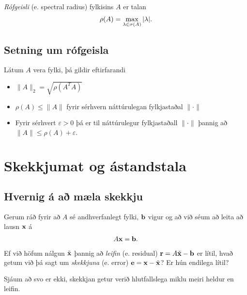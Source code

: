 \documentclass[letterpaper,10pt,icelandic]{sphinxmanual}
\begin{document}
\emph{Rófgeisli} (e. spectral radius) fylkisins \(A\) er talan
\begin{gather}
\begin{split}\rho(A) = \max_{\lambda \in \sigma(A)} |\lambda|.\end{split}\notag
\end{gather}

\subsection{Setning um rófgeisla}
\label{kafli08:setning-um-rofgeisla}\label{kafli08:rofgeisli}
Látum \(A\) vera fylki, þá gildir eftirfarandi
\begin{itemize}
\item {} 
\(\|A\|_2 = \sqrt{\rho(A^T A)}\)

\item {} 
\(\rho(A) \leq \|A\|\) fyrir sérhvern náttúrulegan fylkjastaðal
\(\|\cdot\|\)

\item {} 
Fyrir sérhvert \(\varepsilon>0\) þá er til náttúrulegur
fylkjastaðall \(\|\cdot\|\) þannig að
\(\|A\| \leq \rho(A) + \varepsilon\).

\end{itemize}


\section{Skekkjumat og ástandstala}
\label{kafli08:skekkjumat-og-astandstala}\label{kafli08:index-13}

\subsection{Hvernig á að mæla skekkju}
\label{kafli08:hvernig-a-a-maela-skekkju}
Gerum ráð fyrir að \(A\) sé andhverfanlegt fylki,
\(\mbox{${\bf b}$}\) vigur og að við séum að leita að lausn
\(\mbox{${\bf x}$}\) á
\begin{gather}
\begin{split}A{\bf x}= {\bf b}.\end{split}\notag
\end{gather}
Ef við höfum nálgun \(\tilde {\bf x}\) þannig að \emph{leifin}
(e. residual) \({\bf r} = A\tilde {\bf x}- {\bf b}\) er
lítil, hvað getum við þá sagt um \emph{skekkjuna} (e. error)
\({\bf e}= {\bf x}-\tilde {\bf x}\)? Er hún endilega lítil?

Sjáum að svo er ekki, skekkjan getur verið hlutfallslega miklu meiri
heldur en leifin.
\end{document}
